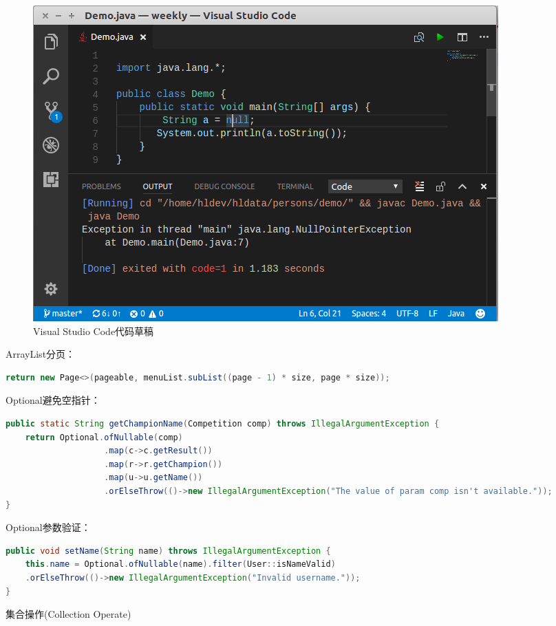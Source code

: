 \documentclass[11pt,fleqn]{book}
\makeatletter
\numberwithin{dummy}{section}
\theoremstyle{ocrenumbox}
\theoremstyle{blacknumex}
\theoremstyle{blacknumbox}
\theoremstyle{ocrenum}
\renewcommand{\subsection}{\@startsection {subsection}{2}{\z@}
	{-3ex \@plus -0.1ex \@minus -.4ex}
	{0.5ex \@plus.2ex }
	{\normalfont\sffamily\bfseries}}
\makeatother
\begin{document}
\begin{figure}[htbp]
	\centering
	\includegraphics[scale=0.5]{visualstudiocodesnippet.png}
	\caption{Visual Studio Code代码草稿}
	\label{fig:visualstudiocodesnippet}
\end{figure}

ArrayList分页：

\begin{lstlisting}[language=Java]
return new Page<>(pageable, menuList.subList((page - 1) * size, page * size));
\end{lstlisting}

Optional避免空指针：

\begin{lstlisting}[language=Java]
public static String getChampionName(Competition comp) throws IllegalArgumentException {
	return Optional.ofNullable(comp)
					.map(c->c.getResult())
					.map(r->r.getChampion())
					.map(u->u.getName())
					.orElseThrow(()->new IllegalArgumentException("The value of param comp isn't available."));
}
\end{lstlisting}

Optional参数验证：

\begin{lstlisting}[language=Java]
public void setName(String name) throws IllegalArgumentException {
	this.name = Optional.ofNullable(name).filter(User::isNameValid)
	.orElseThrow(()->new IllegalArgumentException("Invalid username."));
}
\end{lstlisting}


\subsection{集合操作(Collection Operate)}
\end{document}
